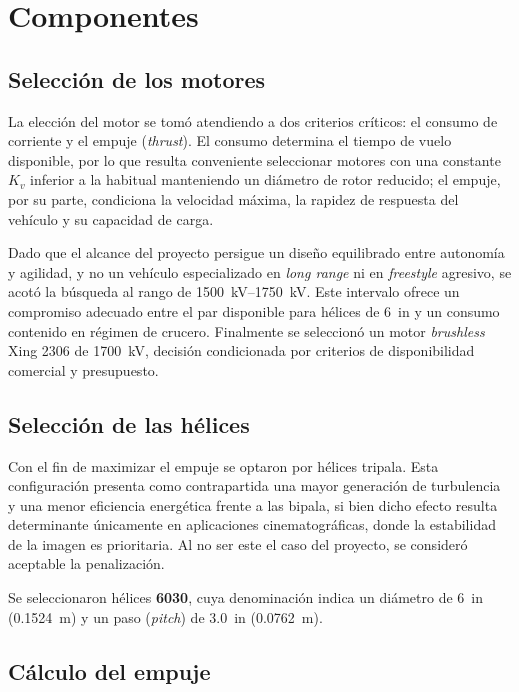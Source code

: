 \documentclass[12pt, letterpaper]{report}
\begin{document}
\section{Componentes}
\subsection{Selección de los motores}

La elección del motor se tomó atendiendo a dos criterios críticos: el consumo 
de corriente y el empuje (\textit{thrust}). El consumo determina el tiempo de 
vuelo disponible, por lo que resulta conveniente seleccionar motores con una 
constante $K_v$ inferior a la habitual manteniendo un diámetro de rotor 
reducido; el empuje, por su parte, condiciona la velocidad máxima, la rapidez 
de respuesta del vehículo y su capacidad de carga.

Dado que el alcance del proyecto persigue un diseño equilibrado entre autonomía 
y agilidad, y no un vehículo especializado en \textit{long range} ni en 
\textit{freestyle} agresivo, se acotó la búsqueda al rango de 
\SIrange{1500}{1750}{\kilo\volt}. Este intervalo ofrece un compromiso adecuado 
entre el par disponible para hélices de \SI{6}{in} y un consumo contenido en 
régimen de crucero. Finalmente se seleccionó un motor \textit{brushless} Xing 
2306 de \SI{1700}{\kilo\volt}, decisión condicionada por criterios de 
disponibilidad comercial y presupuesto.

\subsection{Selección de las hélices}

Con el fin de maximizar el empuje se optaron por hélices tripala. Esta 
configuración presenta como contrapartida una mayor generación de turbulencia y 
una menor eficiencia energética frente a las bipala, si bien dicho efecto 
resulta determinante únicamente en aplicaciones cinematográficas, donde la 
estabilidad de la imagen es prioritaria. Al no ser este el caso del proyecto, se 
consideró aceptable la penalización.

Se seleccionaron hélices \textbf{6030}, cuya denominación indica un diámetro de 
\SI{6}{in} (\SI{0.1524}{\meter}) y un paso (\textit{pitch}) de \SI{3.0}{in} 
(\SI{0.0762}{\meter}).

\subsection{Cálculo del empuje}
\end{document}

